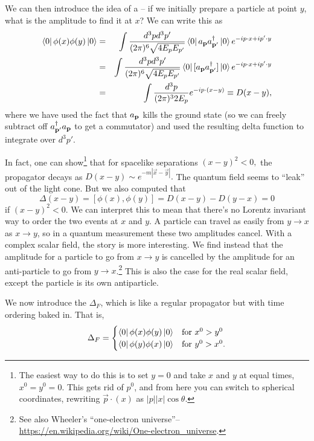 \begin{defn}
We can then introduce the idea of a -- if we initially prepare a particle at point $y$, what is the amplitude to find it at $x$? We can write this as
\begin{eqnarray*}
\left< 0 \right|\phi(x) \phi(y)\left| 0 \right>&=&\int \frac{d^3p d^3 p'}{(2\pi)^6\sqrt{4 E_p E_{p'}}} \left< 0 \right| a_{\boldsymbol{\mathbf{p}}} a_{\boldsymbol{\mathbf{p}}'}^\dagger \left| 0 \right>e^{-ip \cdot x +i p'\cdot y}\\
&=&\int \frac{d^3p d^3 p'}{(2\pi)^6\sqrt{4 E_p E_{p'}}} \left< 0 \right| [a_{\boldsymbol{\mathbf{p}}} a_{\boldsymbol{\mathbf{p}}'}^\dagger] \left| 0 \right>e^{-ip \cdot x +i p'\cdot y}\\
&=&\int \frac{d^3p}{(2\pi)^3 2 E_p}e^{-ip\cdot (x-y)} \equiv D(x-y),
\end{eqnarray*}
where we have used the fact that $a_{\boldsymbol{\mathbf{p}}}$ kills the ground state (so we can freely subtract off $a_{\boldsymbol{\mathbf{p}}'}^\dagger a_{\boldsymbol{\mathbf{p}}}$ to get a commutator) and used the resulting delta function to integrate over $d^3p'$.
\end{defn}

In fact, one can show\footnote{The easiest way to do this is to set $y=0$ and take $x$ and $y$ at equal times, $x^0=y^0=0$. This gets rid of $p^0$, and from here you can switch to spherical coordinates, rewriting $\vec p \cdot (x)$ as $|p||x|\cos\theta$.} that for spacelike separations $(x-y)^2<0,$ the propagator decays as $D(x-y)\sim e^{-m|\vec x-\vec y|}.$ The quantum field seems to ``leak'' out of the light cone. But we also computed that
$$\Delta(x-y)=[\phi(x),\phi(y)] =D(x-y)-D(y-x)=0$$ if $(x-y)^2<0$. We can interpret this to mean that there's no Lorentz invariant way to order the two events at $x$ and $y$. A particle can travel as easily from $y\to x$ as $x\to y$, so in a quantum measurement these two amplitudes cancel. With a complex scalar field, the story is more interesting. We find instead that the amplitude for a particle to go from $x\to y$ is cancelled by the amplitude for an anti-particle to go from $y\to x$.\footnote{See also Wheeler's ``one-electron universe''-- \url{https://en.wikipedia.org/wiki/One-electron_universe}.} This is also the case for the real scalar field, except the particle is its own antiparticle.

\begin{defn}
We now introduce the  $\Delta_F$, which is like a regular propagator but with time ordering baked in. That is,
$$\Delta_F =\begin{cases}
  \left< 0 \right|\phi(x)\phi(y)\left| 0 \right> & \text{for } x^0 > y^0\\    
  \left< 0 \right|\phi(y)\phi(x)\left| 0 \right> & \text{for } y^0 > x^0.
\end{cases}$$
\end{defn}


